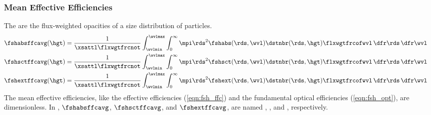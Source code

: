 \documentclass[12pt]{article}
\begin{document}
\subsubsection[Mean Effective Efficiencies]{Mean Effective Efficiencies}\label{sxn:fsh_ffc_avg}
The  are the flux-weighted
opacities of a size distribution of particles.
\begin{subequations}
\label{eqn:fsh_ffc_avg}
\begin{align}
\label{eqn:fsh_abs_ffc_avg}
\fshabsffcavg(\hgt) & = \frac{1}{\xsattl \flxwgtfrcnot} 
\int_{\wvlmin}^{\wvlmax} \int_{0}^{\infty}
\mpi \rds^{2} \fshabs(\rds,\wvl) \dstnbr(\rds,\hgt) \flxwgtfrcofwvl
\,\dfr\rds \,\dfr\wvl \\
\label{eqn:fsh_sct_ffc_avg}
\fshsctffcavg(\hgt) & = \frac{1}{\xsattl \flxwgtfrcnot} 
\int_{\wvlmin}^{\wvlmax} \int_{0}^{\infty}
\mpi \rds^{2} \fshsct(\rds,\wvl) \dstnbr(\rds,\hgt) \flxwgtfrcofwvl
\,\dfr\rds \,\dfr\wvl \\
\label{eqn:fsh_ext_ffc_avg}
\fshextffcavg(\hgt) & = \frac{1}{\xsattl \flxwgtfrcnot} 
\int_{\wvlmin}^{\wvlmax} \int_{0}^{\infty}
\mpi \rds^{2} \fshext(\rds,\wvl) \dstnbr(\rds,\hgt) \flxwgtfrcofwvl
\,\dfr\rds \,\dfr\wvl
\end{align}
\end{subequations}
The mean effective efficiencies, like the effective efficiencies
(\ref{eqn:fsh_ffc}) and the fundamental optical efficiencies
(\ref{eqn:fsh_opt}), are dimensionless. 
In , $\fshabsffcavg$, $\fshsctffcavg$, and
$\fshextffcavg$, are named ,
, and , respectively. 
\end{document}
